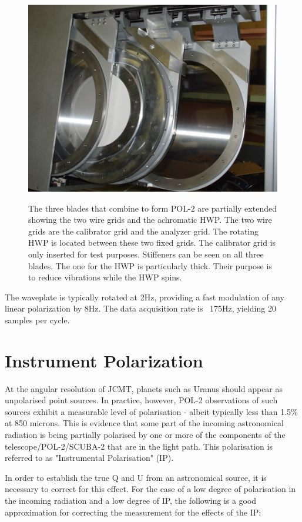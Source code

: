 \begin{figure}[t!]
\begin{center}
\includegraphics[width=0.7\linewidth]{pol2-three-components.png}
\label{fig:pol2components}
\caption [POL-2 components]{
  \small The three blades that combine to form POL-2 are partially
  extended showing the two wire grids and the achromatic HWP.
  The two wire grids are the calibrator grid and the analyzer grid.
  The rotating HWP is located between these two fixed grids.
  The calibrator grid is only inserted for test purposes.
  Stiffeners can be seen on all three blades. The one for the HWP
  is particularly thick. Their purpose is to reduce vibrations while
  the HWP spins.
}
\end{center}
\end{figure}

The waveplate is typically rotated at 2Hz, providing a fast modulation of any linear polarization by 8Hz.
The data acquisition rate is ~175Hz, yielding 20 samples per cycle.



\section{Instrument Polarization}

At the angular resolution of JCMT, planets such as Uranus should appear as unpolarised point sources.
In practice, however, POL-2 observations of such sources exhibit a measurable level of polarisation - albeit typically less
than 1.5\% at 850 microns. This is evidence that some part of the incoming astronomical radiation
is being partially polarised by one or more of the components of the telescope/POL-2/SCUBA-2
that are in the light path. This polarisation is referred to as "Instrumental Polarisation" (IP).

In order to establish the true Q and U from an astronomical source, it is necessary to correct
for this effect. For the case of a low degree of polarisation in the incoming radiation and a low
degree of IP, the following is a good approximation for correcting the measurement for the effects of the IP:

